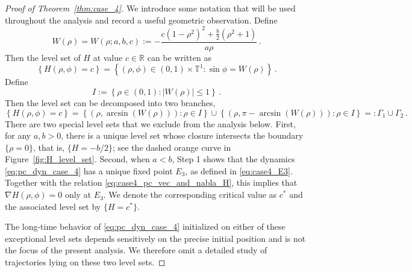 \documentclass[10pt]{article}
\theoremstyle{definition}
\theoremstyle{definition}
\numberwithin{equation}{section}
\newcommand{\R}{\mathbb{R}}
\newcommand{\BBT}{\mathbb{T}}
\begin{document}
\begin{proof}[Proof of Theorem~\ref{thm:case_4}]
We introduce some notation that will be used throughout the analysis and record a useful geometric observation.
Define 
\begin{equation}\label{eq:case4_func_W}
W(\rho) = W(\rho;a,b,c) := -\frac{c(1-\rho^2)^2 + \frac{b}{2}(\rho^2 + 1)}{a\rho} \, .
\end{equation}  
Then the level set of $H$ at value $c \in \R$ can be written as
\begin{equation}\label{eq:case4_H_level_set_parametrization}
\left\{ H(\rho, \phi) = c \right\} = \left\{ (\rho, \phi) \in (0,1) \times \BBT^1: \sin \phi = W(\rho) \right\} \, .
\end{equation}
Define 
\begin{equation}\label{eq:case4_set_I}
    I := \left\{ \rho \in (0,1): |W(\rho)| \leq 1 \right\} \, .
\end{equation}
Then the level set can be decomposed into two branches,
\begin{equation}\label{eq:case4_Gamma_1_2}
\left\{ H(\rho, \phi) = c \right\} = \left\{ (\rho, \arcsin (W(\rho))): \rho \in I \right\} \cup \left\{ (\rho, \pi - \arcsin (W(\rho))) : \rho \in I \right\} =: \Gamma_1 \cup \Gamma_2  \, .
\end{equation}
There are two special level sets that we exclude from the analysis below.
First, for any $a, b > 0$, there is a unique level set whose closure intersects the boundary $\{\rho = 0\}$, that is, $\{H = -b/2\}$;
see the dashed orange curve in Figure~\ref{fig:H_level_set}.
Second, when $a < b$, Step 1 shows that the dynamics \eqref{eq:pc_dyn_case_4} has a unique fixed point $E_3$, as defined in \eqref{eq:case4_E3}.
Together with the relation \eqref{eq:case4_pc_vec_and_nabla_H}, this implies that $\nabla H(\rho, \phi) = 0$ only at $E_3$.
We denote the corresponding critical value as $c^*$ and the associated level set by $\{H = c^*\}$.

The long-time behavior of \eqref{eq:pc_dyn_case_4} initialized on either of these exceptional level sets depends sensitively on the precise initial position and is not the focus of the present analysis. 
We therefore omit a detailed study of trajectories lying on these two level sets.


\end{proof}
\end{document}
